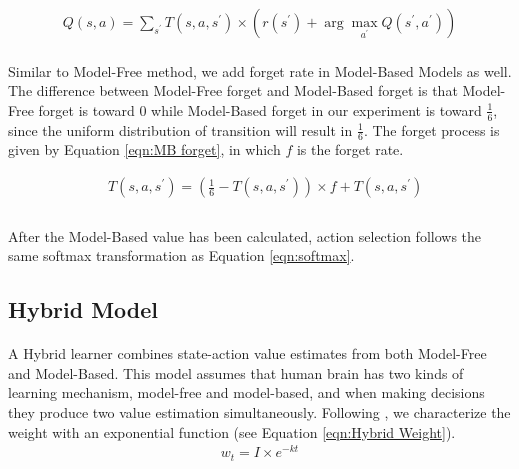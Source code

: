 \begin{equation}
\begin{aligned}
Q(s,a)=\sum_{s^{\prime}}T(s,a,s^{\prime})\times(r(s^{\prime})+\arg \max_{a^{\prime}}Q(s^{\prime},a^{\prime}) )
\end{aligned}
\label{eqn:Backforward Q}
\end{equation}

\paragraph{}
Similar to Model-Free method, we add forget rate in Model-Based Models as well. The difference between Model-Free forget and Model-Based forget is that Model-Free forget is toward 0 while Model-Based forget in our experiment is toward $\frac{1}{6}$, since the uniform distribution of transition will result in $\frac{1}{6}$. The forget process is given by Equation \ref{eqn:MB forget}, in which $f$ is the forget rate. 

\begin{equation}
\begin{aligned}
&T(s,a,s^{\prime})=(\frac{1}{6} - T(s,a,s^{\prime})) \times f + T(s,a,s^{\prime}) \\
\end{aligned}
\label{eqn:MB forget}
\end{equation}


\paragraph{}
After the Model-Based value has been calculated, action selection follows the same softmax transformation as Equation \ref{eqn:softmax}. 

\subsection{Hybrid Model}
\label{sec:Hybrid Model}
\paragraph{}
A Hybrid learner combines state-action value estimates from both Model-Free and Model-Based. This model assumes that human brain has two kinds of learning mechanism, model-free and model-based, and when making decisions they produce two value estimation simultaneously. Following \citet{bucci1998removal}, we characterize the weight with an exponential function (see Equation \ref{eqn:Hybrid Weight}). %
\begin{equation}
\begin{aligned}
w_t=I\times e^{-kt}
\end{aligned}
\label{eqn:Hybrid Weight}
\end{equation}

